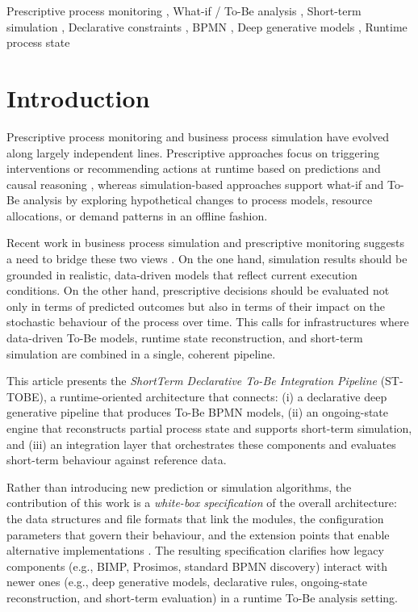 \documentclass[a4paper,fleqn]{cas-sc}
\begin{document}
\begin{keywords}
Prescriptive process monitoring \sep
What-if / To-Be analysis \sep
Short-term simulation \sep
Declarative constraints \sep
BPMN \sep
Deep generative models \sep
Runtime process state
\end{keywords}

\maketitle

\section{Introduction}

Prescriptive process monitoring and business process simulation
have evolved along largely independent lines.  
Prescriptive approaches focus on triggering interventions or
recommending actions at runtime based on predictions and causal
reasoning \citep{Shoush2025IS,Shoush2024arXiv}, whereas simulation-based approaches support what-if and
To-Be analysis by exploring hypothetical changes to process models,
resource allocations, or demand patterns in an offline fashion.

Recent work in business process simulation and prescriptive
monitoring suggests a need to bridge these two views
\citep{Meneghello2025IS,Avramenko2025arXiv}.
On the one hand, simulation results should be grounded in realistic, 
data-driven models that reflect current execution conditions.
On the other hand, prescriptive decisions should be evaluated not only
in terms of predicted outcomes but also in terms of their impact on the
stochastic behaviour of the process over time.
This calls for infrastructures where
data-driven To-Be models, runtime state reconstruction, and
short-term simulation are combined in a single, coherent pipeline.

This article presents the \emph{ShortTerm Declarative To-Be Integration Pipeline}
(ST-TOBE), a runtime-oriented architecture that connects:
(i) a declarative deep generative pipeline that produces To-Be BPMN models,
(ii) an ongoing-state engine that reconstructs partial process state and
supports short-term simulation, and
(iii) an integration layer that orchestrates these components and evaluates
short-term behaviour against reference data.

Rather than introducing new prediction or simulation algorithms, the
contribution of this work is a \emph{white-box specification} of the
overall architecture: the data structures and file formats that link
the modules, the configuration parameters that govern their behaviour,
and the extension points that enable alternative implementations
\citep{Shoush2025IS}.
The resulting specification clarifies how legacy components (e.g., BIMP,
Prosimos, standard BPMN discovery) interact with newer ones
(e.g., deep generative models, declarative rules, ongoing-state
reconstruction, and short-term evaluation) in a runtime To-Be analysis setting.
\end{document}
